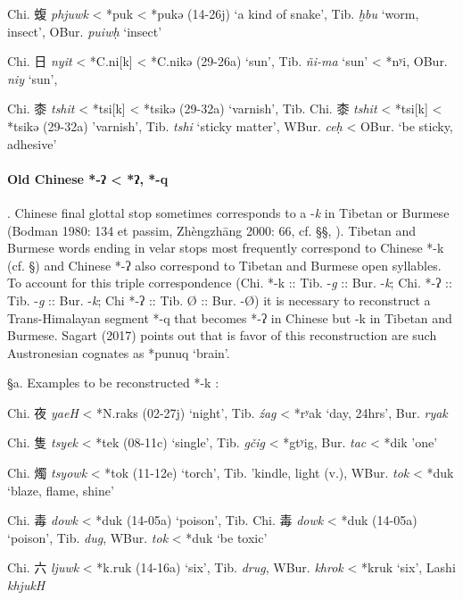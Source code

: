 \begin{description}
\item Chi. 蝮  \emph{phjuwk} \textless{} *p{}uk \textless{} *p{}ukə (14-26j) `a
kind of snake', Tib. {} \emph{ḫbu} `worm, insect', OBur. {} \emph{puiwḥ} `insect'

Chi. 日  \emph{nyit} \textless{} *C.ni{[}k] \textless{} *C.nikə
(29-26a) `sun', Tib. {} \emph{ñi-ma} `sun' \textless{} *nʸi, OBur. {} \emph{niy} `sun',

\item
Chi. 桼 \emph{tshit} \textless{} *ts{}i{[}k] \textless{} *ts{}ikə
(29-32a) `varnish', Tib. %
Chi. 桼
 \emph{tshit} \textless{} *ts{}i{[}k] \textless{} *ts{}ikə (29-32a)
'varnish', Tib. {} \emph{tshi} `sticky matter', WBur. {} \emph{ceḥ}
\textless{} OBur. {} `be sticky, adhesive'
\end{description}

\paragraph{Old Chinese *-ʔ \textless{} *ʔ, *-q}. Chinese final
glottal stop sometimes corresponds to a -\emph{k} in Tibetan or Burmese
(Bodman 1980: 134 et passim, Zhèngzhāng 2000: 66, cf. §§, ). Tibetan and
Burmese words ending in velar stops most frequently correspond to
Chinese *-k (cf. §) and Chinese *-ʔ also correspond to Tibetan and
Burmese open syllables. To account for this triple correspondence (Chi.
*-k :: Tib. -\emph{g} :: Bur. -\emph{k}; Chi. *-ʔ :: Tib. -\emph{g} ::
Bur. -\emph{k}; Chi *-ʔ :: Tib. Ø :: Bur. -Ø) it is necessary to
reconstruct a Trans-Himalayan segment *-q that becomes *-ʔ in Chinese
but -k in Tibetan and Burmese. Sagart (2017) points out that is favor of
this reconstruction are such Austronesian cognates as *punuq `brain'.

§a. Examples to be reconstructed *-k :

\begin{description} \item
Chi. 夜  \emph{yaeH} \textless{} *N.raks (02-27j) `night', Tib. {} \emph{źag} \textless{} *rʸak `day, 24hrs', Bur. {} \emph{ryak}
\item
Chi. 隻  \emph{tsyek} \textless{} *tek (08-11c) `single', Tib. {} \emph{gčig} \textless{} *gtʸig, Bur. {} \emph{tac} \textless{} *dik
'one'
\item
Chi. 燭  \emph{tsyowk }\textless{} *tok (11-12e) `torch', Tib. {}
'kindle, light (v.), WBur. {} \emph{tok} \textless{} *duk `blaze,
flame, shine'
\item
Chi. 毒  \emph{dowk} \textless{} *d{}uk (14-05a) `poison', Tib.
\protect\hypertarget{anchor-55}{}{}Chi. 毒 \emph{dowk} \textless{} *d{}uk
(14-05a) `poison', Tib. {} \emph{dug}, WBur. {} \emph{tok}
\textless{} *duk `be toxic'
\item
Chi. 六  \emph{ljuwk} \textless{} *k.ruk (14-16a) `six', Tib. {} \emph{drug}, WBur. {} \emph{khrok} \textless{} *kruk `six', Lashi
 \emph{khjukH}
\end{description}

